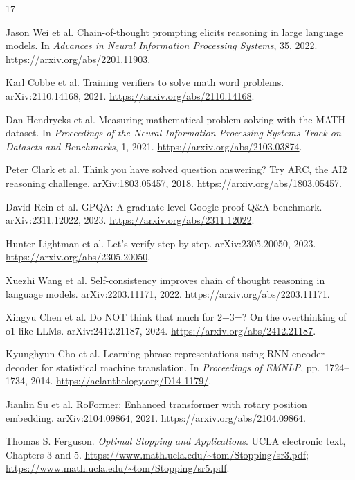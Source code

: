 \begin{thebibliography}{17}

Jason Wei et al.
Chain-of-thought prompting elicits reasoning in large language models.
In \emph{Advances in Neural Information Processing Systems}, 35, 2022.
\url{https://arxiv.org/abs/2201.11903}.

Karl Cobbe et al.
Training verifiers to solve math word problems.
arXiv:2110.14168, 2021.
\url{https://arxiv.org/abs/2110.14168}.

Dan Hendrycks et al.
Measuring mathematical problem solving with the MATH dataset.
In \emph{Proceedings of the Neural Information Processing Systems Track on
Datasets and Benchmarks}, 1, 2021.
\url{https://arxiv.org/abs/2103.03874}.

Peter Clark et al.
Think you have solved question answering? Try ARC, the AI2 reasoning challenge.
arXiv:1803.05457, 2018.
\url{https://arxiv.org/abs/1803.05457}.

David Rein et al.
GPQA: A graduate-level Google-proof Q\&A benchmark.
arXiv:2311.12022, 2023.
\url{https://arxiv.org/abs/2311.12022}.

Hunter Lightman et al.
Let's verify step by step.
arXiv:2305.20050, 2023.
\url{https://arxiv.org/abs/2305.20050}.

Xuezhi Wang et al.
Self-consistency improves chain of thought reasoning in language models.
arXiv:2203.11171, 2022.
\url{https://arxiv.org/abs/2203.11171}.

Xingyu Chen et al.
Do NOT think that much for 2+3=? On the overthinking of o1-like LLMs.
arXiv:2412.21187, 2024.
\url{https://arxiv.org/abs/2412.21187}.

Kyunghyun Cho et al.
Learning phrase representations using RNN encoder--decoder for statistical
machine translation.
In \emph{Proceedings of EMNLP}, pp.\ 1724--1734, 2014.
\url{https://aclanthology.org/D14-1179/}.

Jianlin Su et al.
RoFormer: Enhanced transformer with rotary position embedding.
arXiv:2104.09864, 2021.
\url{https://arxiv.org/abs/2104.09864}.

Thomas S. Ferguson.
\emph{Optimal Stopping and Applications}.
UCLA electronic text, Chapters 3 and 5.
\url{https://www.math.ucla.edu/~tom/Stopping/sr3.pdf};
\url{https://www.math.ucla.edu/~tom/Stopping/sr5.pdf}.


\end{thebibliography}

